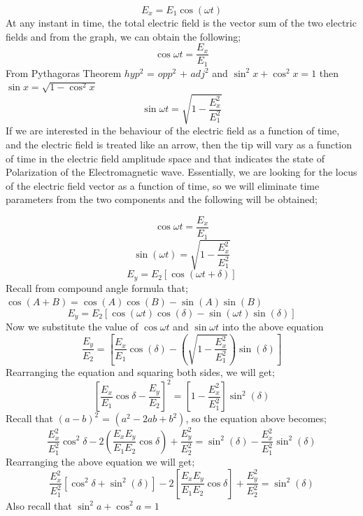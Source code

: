 \begin{equation}
E_x = E_1 \cos(\omega t)
\end{equation}
At any instant in time, the total electric field is the vector sum of the two electric  fields and from the graph, we can obtain the following;
\begin{equation}
\cos {\omega t} = \frac {E_x}{E_1} 
\end{equation}
From Pythagoras Theorem $hyp^2$ = $opp^2$ + $adj^2$ and $\sin^2 x + \cos^2 x = 1$ then $\sin x = \sqrt{1-\cos^ 2x}$
\begin{equation}
\sin {\omega t} = \sqrt{1 - \frac{E_{x}^2}{E_{1}^2}}
\end{equation}
If we are interested in the behaviour of the electric field as a function of time, and the electric field is treated like an arrow, then the tip will vary as a function of time in the electric field amplitude space and that indicates the state of Polarization of the Electromagnetic wave. Essentially, we are looking for the locus of the electric field vector as a function of time, so we will eliminate time parameters from the two components and the following will be obtained;

\begin{equation}
\cos{\omega t} = \frac{E_x}{E_1}
\end{equation}
\begin{equation}
\sin (\omega t) = \sqrt{1-\frac{E_{x}^2}{E_{1}^2}}
\end{equation}
\begin{equation}
E_y = E_2 [\cos(\omega t + \delta)]
\end{equation}
Recall from compound angle formula that; $\cos(A+B) = \cos(A)\cos(B) - \sin(A)\sin(B)$ 
\begin{equation}
E_y = E_2 [\cos(\omega t)\cos(\delta) -\sin(\omega t) \sin(\delta)]
\end{equation}
Now we substitute the value of $\cos{\omega t}$ and $\sin{\omega t}$ into the above equation
\begin{equation}
\frac{E_y}{E_2} =[\frac{E_x}{E_1}\cos(\delta)-(\sqrt{1 - \frac{E_{x}^2}{E_{1}^2}})\sin(\delta)]
\end{equation}
Rearranging the equation and squaring both sides, we will get;
\begin{equation}
{[\frac{E_x}{E_1}\cos{\delta}-\frac{E_y}{E_2}]}^2 = [1-\frac{E_{x}^2}{E_{1}^2}]\sin^2(\delta)
\end{equation}
Recall that ${(a-b)}^2$ = $(a^2-2ab+b^2)$, so the equation above becomes;
\begin{dmath}
\frac{E_{x}^2}{E_{1}^2}\cos^2{\delta}-2(\frac{E_{x}E_{y}}{E_{1}E_{2}}\cos{\delta}) + \frac{E_{y}^2}{E_{2}^2} = \sin^2(\delta)-\frac{E_{x}^2}{E_{1}^2}\sin^2(\delta)
\end{dmath}
Rearranging the above equation we will get;
\begin{equation}
\frac{E_{x}^2}{E_{1}^2}[\cos^2{\delta} + \sin ^2(\delta)] - 2[\frac{E_{x}E_{y}}{E_{1}E_{2}}\cos{\delta}] + \frac{E_{y}^2}{E_{2}^2} = \sin^2(\delta)
\end{equation}
Also recall that $ \sin^2{a} + \cos^2{a} =  1$

